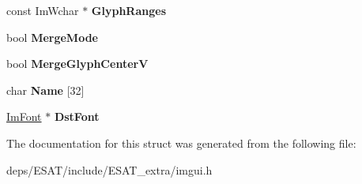 \begin{DoxyCompactItemize}
\mbox{\label{struct_im_font_config_aa174ceff80323012cd1b717d864258dd}} 
const Im\+Wchar $\ast$ {\bfseries Glyph\+Ranges}
\item 
\mbox{\label{struct_im_font_config_ad5cab281622e5bdec8e2d55cadc5601e}} 
bool {\bfseries Merge\+Mode}
\item 
\mbox{\label{struct_im_font_config_a477ee0c697cb41b27710a1f6c05389eb}} 
bool {\bfseries Merge\+Glyph\+CenterV}
\item 
\mbox{\label{struct_im_font_config_abcd5db10139b42fbac90e31512c64f08}} 
char {\bfseries Name} \mbox{[}32\mbox{]}
\item 
\mbox{\label{struct_im_font_config_a561773c311f6cf6de00642c2801e7b92}} 
\mbox{\hyperlink{struct_im_font}{Im\+Font}} $\ast$ {\bfseries Dst\+Font}
\end{DoxyCompactItemize}


The documentation for this struct was generated from the following file\+:\begin{DoxyCompactItemize}
\item 
deps/\+E\+S\+A\+T/include/\+E\+S\+A\+T\+\_\+extra/imgui.\+h\end{DoxyCompactItemize}
